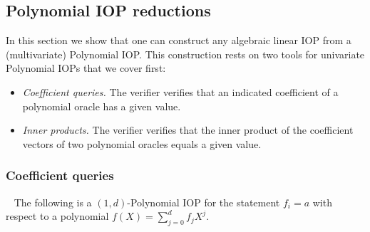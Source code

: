 \subsection{Polynomial IOP reductions} 

In this section we show that one can construct any algebraic linear IOP from a (multivariate) Polynomial IOP. This construction rests on two tools for univariate Polynomial IOPs that we cover first:
\begin{itemize}
    \item \emph{Coefficient queries.} The verifier verifies that an indicated coefficient of a polynomial oracle has a given value.
    \item \emph{Inner products.} The verifier verifies that the inner product of the coefficient vectors of two polynomial oracles equals a given value.
\end{itemize}

\subsubsection{Coefficient queries}~\label{sec:opencoefficient} 
The following is a $(1, d)$-Polynomial IOP for the statement $f_i = a$ with respect to a polynomial $f(X) = \sum_{j=0}^d f_j X^j$. %

